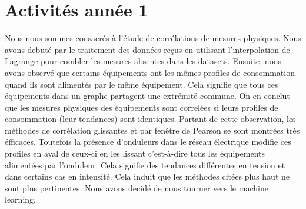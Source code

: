 \documentclass[onecolumn, 12pt]{article}
\begin{document}
\section{Activit\'es ann\'ee 1}
Nous nous sommes consacr\'es \`a l'\'etude de corr\'elations de mesures physiques. \newline
Nous avons debut\'e par le traitement des donn\'ees re\c cus en utilisant l'interpolation de Lagrange pour combler les mesures absentes dans les datasets. \newline
Ensuite,  nous avons observ\'e que certains \'equipements ont les m\^emes profiles de consommation quand ils sont aliment\'es par le m\^eme \'equipement. 
Cela signifie que tous ces \'equipements dans un graphe partagent une extr\'emit\'e commune. 
On en conclut que les mesures physiques des \'equipements sont correl\'ees  si leurs profiles de consommation (leur tendances) sont identiques.
Partant de cette observation, les m\'ethodes de corr\'elation glissantes et par fen\^etre de Pearson se sont montr\'ees tr\`es \'efficaces. 
\newline
Toutefois la pr\'esence d'onduleurs dans le r\'eseau \'electrique modifie ces profiles en aval de ceux-ci en les lissant c'est-\`a-dire tous les \'equipements aliment\'ees par l'onduleur. 
Cela signifie des tendances diff\'erentes en tension et dans certains cas en intensit\'e. Cela induit que les m\'ethodes cit\'ees plus haut ne sont plus pertinentes. Nous avons decid\'e de nous tourner vers le machine learning.
\end{document}
